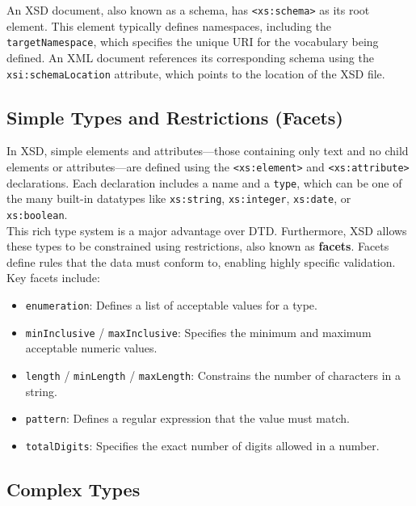 \documentclass{scrbook}
\begin{document}
An XSD document, also known as a schema, has \texttt{<xs:schema>} as its root element. This element typically defines namespaces, including the \texttt{targetNamespace}, which specifies the unique URI for the vocabulary being defined. An XML document references its corresponding schema using the \texttt{xsi:schemaLocation} attribute, which points to the location of the XSD file.

\subsection{Simple Types and Restrictions (Facets)}

In XSD, simple elements and attributes—those containing only text and no child elements or attributes—are defined using the \texttt{<xs:element>} and \texttt{<xs:attribute>} declarations. Each declaration includes a name and a \texttt{type}, which can be one of the many built-in datatypes like \texttt{xs:string}, \texttt{xs:integer}, \texttt{xs:date}, or \texttt{xs:boolean}. \\

This rich type system is a major advantage over DTD. Furthermore, XSD allows these types to be constrained using restrictions, also known as \textbf{facets}. Facets define rules that the data must conform to, enabling highly specific validation. Key facets include:

\begin{itemize}
    \item
    \texttt{enumeration}: Defines a list of acceptable values for a type.

    \item 
    \texttt{minInclusive} / \texttt{maxInclusive}: Specifies the minimum and maximum acceptable numeric values.

    \item 
    \texttt{length} / \texttt{minLength} / \texttt{maxLength}: Constrains the number of characters in a string.

    \item 
    \texttt{pattern}: Defines a regular expression that the value must match.

    \item 
    \texttt{totalDigits}: Specifies the exact number of digits allowed in a number.
\end{itemize}

\subsection{Complex Types}
\end{document}
